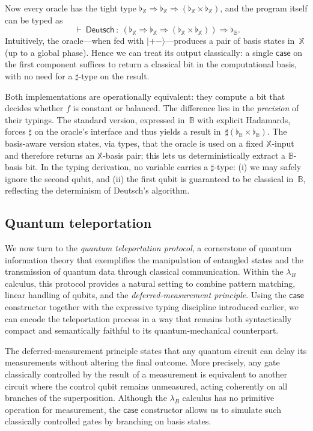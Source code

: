 \documentclass[runningheads,orivec,envcountsame,envcountsect]{llncs}
\newcommand\ket[1]{\ensuremath{|#1\rangle}}
\def\Arr{\Rightarrow}
\def\TYP#1#2#3{#1~{\vdash}~#2~{:}~#3}
\newcommand\B{\mathbb B}
\newcommand\XB{\mathbb X}
\newcommand{\lambdaB}{\lambda_B}
\newcommand\basis[1]{\ensuremath{\flat_{#1}}}
\begin{document}
Now every oracle has the tight type
\(
  \basis{\XB}\Arr\basis{\XB}\Arr(\basis{\XB}\times\basis{\XB})
\),
and the program itself can be typed as
\[
  \TYP{}{\mathsf{Deutsch}}
  {(\basis{\XB}\Arr\basis{\XB}\Arr(\basis{\XB}\times\basis{\XB}))\Arr\basis{\B}}.
\]
Intuitively, the oracle---when fed with $\ket{+-}$---produces a pair of
basis states in~$\XB$ (up to a global phase).  Hence we can treat its output
classically: a single $\mathsf{case}$ on the first component suffices to return
a classical bit in the computational basis, with no need for a $\sharp$-type on
the result.

Both implementations are operationally equivalent: they compute a bit that
decides whether $f$ is constant or balanced.  The difference lies in the
\emph{precision} of their typings.  The standard version, expressed in~$\B$
with explicit Hadamards, forces $\sharp$ on the oracle's interface and thus
yields a result in~$\sharp(\basis{\B}\times\basis{\B})$.  The basis-aware
version states, via types, that the oracle is used on a fixed $\XB$-input and
therefore returns an $\XB$-basis pair; this lets us deterministically extract a
$\B$-basis bit.  In the typing derivation, no variable carries a $\sharp$-type:
(i) we may safely ignore the second qubit, and (ii) the first qubit is
guaranteed to be classical in~$\B$, reflecting the determinism of Deutsch's
algorithm.


\subsection{Quantum teleportation}\label{sec:teleportation}
We now turn to the \emph{quantum teleportation protocol}, a cornerstone of
quantum information theory that exemplifies the manipulation of entangled
states and the transmission of quantum data through classical communication.
Within the $\lambdaB$ calculus, this protocol provides a natural setting to
combine pattern matching, linear handling of qubits, and the
\emph{deferred-measurement principle}.  
Using the $\mathsf{case}$ constructor together with the expressive typing
discipline introduced earlier, we can encode the teleportation process in a
way that remains both syntactically compact and semantically faithful to its
quantum-mechanical counterpart.

The deferred-measurement principle states that any quantum circuit can delay
its measurements without altering the final outcome.  
More precisely, any gate classically controlled by the result of a measurement
is equivalent to another circuit where the control qubit remains unmeasured,
acting coherently on all branches of the superposition.  
Although the $\lambdaB$ calculus has no primitive operation for measurement,
the $\mathsf{case}$ constructor allows us to simulate such classically
controlled gates by branching on basis states.
\end{document}
